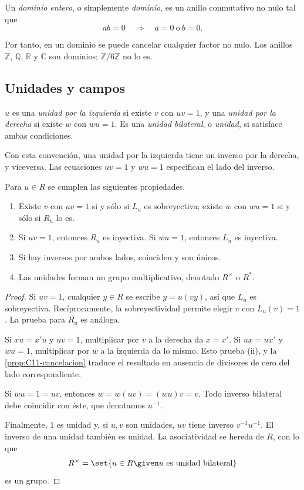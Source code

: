 \begin{defi}
Un \emph{dominio entero}, o simplemente \emph{dominio}, es un anillo conmutativo no nulo tal que
\[
ab=0\quad\Longrightarrow\quad a=0\ \text{o}\ b=0.
\]
\end{defi}
Por tanto, en un dominio se puede cancelar cualquier factor no nulo. Los anillos $\mathbb Z$, $\mathbb Q$, $\mathbb R$ y $\mathbb C$ son dominios; $\mathbb Z/6\mathbb Z$ no lo es.

\subsection{Unidades y campos}
\begin{defi}
$u$ es una \emph{unidad por la izquierda} si existe $v$ con $uv=1$, y una \emph{unidad por la derecha} si existe $w$ con $wu=1$. Es una \emph{unidad bilateral}, o \emph{unidad}, si satisface ambas condiciones.
\end{defi}
\begin{obs}
Con esta convención, una unidad por la izquierda tiene un inverso por la derecha, y viceversa. Las ecuaciones $uv=1$ y $wu=1$ especifican el lado del inverso.
\end{obs}

\begin{prop}\label{prop:C11-unidades}
Para $u\in R$ se cumplen las siguientes propiedades.
\begin{enumerate}[label=\textup{(\roman*)}]
\item Existe $v$ con $uv=1$ si y sólo si $L_u$ es sobreyectiva; existe $w$ con $wu=1$ si y sólo si $R_u$ lo es.
\item Si $uv=1$, entonces $R_u$ es inyectiva. Si $wu=1$, entonces $L_u$ es inyectiva.
\item Si hay inversos por ambos lados, coinciden y son únicos.
\item Las unidades forman un grupo multiplicativo, denotado $R^\times$ o $R^*$.
\end{enumerate}
\end{prop}
\begin{proof}
Si $uv=1$, cualquier $y\in R$ se escribe $y=u(vy)$, así que $L_u$ es sobreyectiva. Recíprocamente, la sobreyectividad permite elegir $v$ con $L_u(v)=1$. La prueba para $R_u$ es análoga.

Si $xu=x'u$ y $uv=1$, multiplicar por $v$ a la derecha da $x=x'$. Si $ux=ux'$ y $wu=1$, multiplicar por $w$ a la izquierda da lo mismo. Esto prueba (ii), y la \cref{prop:C11-cancelacion} traduce el resultado en ausencia de divisores de cero del lado correspondiente.

Si $wu=1=uv$, entonces $w=w(uv)=(wu)v=v$. Todo inverso bilateral debe coincidir con éste, que denotamos $u^{-1}$.

Finalmente, $1$ es unidad y, si $u,v$ son unidades, $uv$ tiene inverso $v^{-1}u^{-1}$. El inverso de una unidad también es unidad. La asociatividad se hereda de $R$, con lo que
\[
R^\times=\set{u\in R\given u\text{ es unidad bilateral}}
\]
es un grupo.
\end{proof}


